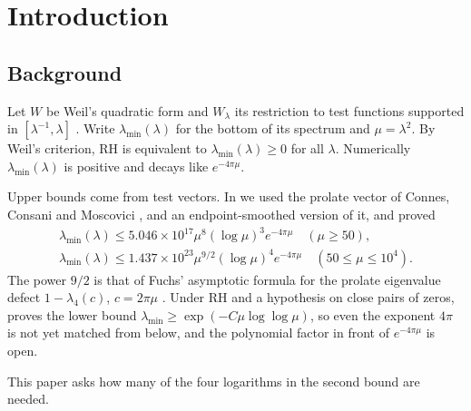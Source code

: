 \documentclass[11pt]{amsart}
\theoremstyle{remark}
\numberwithin{equation}{section}
\begin{document}
\section{Introduction}

\subsection{Background}
Let $W$ be Weil's quadratic form and $W_\lambda$ its restriction to test functions supported in $[\lambda^{-1},\lambda]$ \cite{CC21,CCM25}. Write $\lambda_{\min}(\lambda)$ for the bottom of its spectrum and $\mu=\lambda^2$. By Weil's criterion, RH is equivalent to $\lambda_{\min}(\lambda)\ge0$ for all $\lambda$. Numerically $\lambda_{\min}(\lambda)$ is positive and decays like $e^{-4\pi\mu}$.

Upper bounds come from test vectors. In \cite{MoriWeilII,MoriWeilIII} we used the prolate vector of Connes, Consani and Moscovici \cite[\S7]{CCM25}, and an endpoint-smoothed version of it, and proved
\begin{gather*}
\lambda_{\min}(\lambda)\le5.046\times10^{17}\mu^8(\log\mu)^3e^{-4\pi\mu}\quad(\mu\ge50),\\
\lambda_{\min}(\lambda)\le1.437\times10^{23}\mu^{9/2}(\log\mu)^4e^{-4\pi\mu}\quad(50\le\mu\le10^4).
\end{gather*}
The power $9/2$ is that of Fuchs' asymptotic formula for the prolate eigenvalue defect $1-\lambda_4(c)$, $c=2\pi\mu$ \cite{Fuchs64,MoriPSWF}. Under RH and a hypothesis on close pairs of zeros, \cite{MoriWeilIV} proves the lower bound $\lambda_{\min}\ge\exp(-C\mu\log\log\mu)$, so even the exponent $4\pi$ is not yet matched from below, and the polynomial factor in front of $e^{-4\pi\mu}$ is open.

This paper asks how many of the four logarithms in the second bound are needed.
\end{document}
